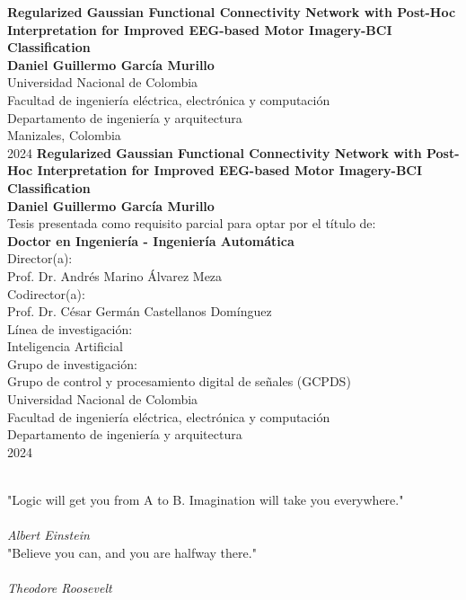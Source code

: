 \documentclass[10pt,enlgish,openany,twoside,letterpaper]{book}
\newcommand{\studentname}{}
\newcommand{\academictitle}{}
\newcommand{\resgroupone}{}
\newcommand{\researchtopic}{}
\newcommand{\thesisname}{}
\newcommand{\director}{}
\newcommand{\codirector}{}
\newcommand{\issuedate}{}
\newcommand{\sede}{}
\newcommand{\department}{}
\newcommand{\faculty}{}
\renewcommand{\studentname}{Daniel Guillermo García Murillo}
\renewcommand{\thesisname}{Regularized Gaussian Functional Connectivity Network with Post-Hoc Interpretation for Improved EEG-based Motor Imagery-BCI Classification}
\renewcommand{\issuedate}{2024}
\renewcommand{\director}{Prof. Dr. Andrés Marino Álvarez Meza}
\renewcommand{\codirector}{Prof. Dr. César Germán Castellanos Domínguez}
\renewcommand{\academictitle}{Doctor en Ingeniería - Ingeniería Automática}
\renewcommand{\resgroupone}{Grupo de control y procesamiento digital de señales (GCPDS) }
\renewcommand{\researchtopic}{Inteligencia Artificial}
\renewcommand{\sede}{Manizales}
\renewcommand{\department}{Departamento de ingeniería y arquitectura}
\renewcommand{\faculty}{Facultad de ingeniería eléctrica, electrónica y computación}
\begin{document}
{\newpage
\thispagestyle{empty}
\begin{center}
\begin{figure}
\centering
{}%
\end{figure}
\vspace{2.5cm}
\textbf{\Huge \thesisname} \\ 
\vspace{2.5cm}
\textbf{\Large \studentname} \\
\vspace{5.0cm}
\small Universidad Nacional de Colombia \\
\faculty \\
\department \\
\sede, Colombia\\
\issuedate
\newpage 
\thispagestyle{empty}
\vspace{2.5cm}
\textbf{\Huge \thesisname} \\
\vspace{2.5cm}
\textbf{\Large \studentname} \\
\vspace{2.5cm}
\small Tesis presentada como requisito parcial para optar por el título de: \\
{\bfseries \academictitle}\\
\vspace{2.5cm}
Director(a): \\
\director \\
Codirector(a): \\
\codirector \\
\vspace{2.5cm}
Línea de investigación: \\ 
\researchtopic\\
Grupo de investigación: \\
\resgroupone \\
\vspace{2.0cm} 
Universidad Nacional de Colombia \\
\faculty \\
\department \\
\issuedate
\end{center}

\newpage
\thispagestyle{empty}
\begin{flushright}
\begin{minipage}{12.5cm}
\noindent
\\[10em]
"Logic will get you from A to B. Imagination will take you everywhere."
\\[3em]
\\ \textit{Albert Einstein}
\\[10em]
"Believe you can, and you are halfway there."
\\[3em]
\\ \textit{Theodore Roosevelt}
\end{minipage}
\end{flushright} 

}
\end{document}

